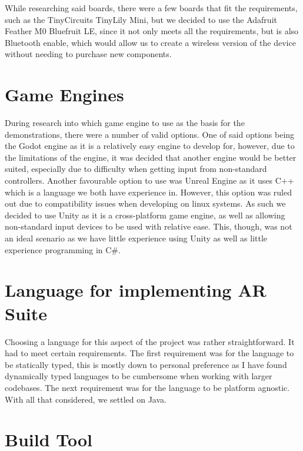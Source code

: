 \documentclass[12pt,a4paper,oneside]{book}
\theoremstyle{plain}
\numberwithin{equation}{chapter}
\newcounter{Secnum}
\begin{document}
\noindent While researching said boards, there were a few boards that fit the requirements, such as the TinyCircuits TinyLily Mini, but we decided to use the Adafruit Feather M0 Bluefruit LE, since it not only meets all the requirements, but is also Bluetooth enable, which would allow us to create a wireless version of the device without needing to purchase new components.

\section{\textbf{Game Engines}}

\noindent During research into which game engine to use as the basis for the demonstrations, there were a number of valid options. One of said options being the Godot engine as it is a relatively easy engine to develop for, however, due to the limitations of the engine, it was decided that another engine would be better suited, especially due to difficulty when getting input from non-standard controllers. Another favourable option to use was Unreal Engine as it uses C++ which is a language we both have experience in. However, this option was ruled out due to compatibility issues when developing on linux systems. As such we decided to use Unity as it is a cross-platform game engine, as well as allowing non-standard input devices to be used with relative ease. This, though, was not an ideal scenario as we have little experience using Unity as well as little experience programming in C\#.

\section{Language for implementing AR Suite}

\noindent Choosing a language for this aspect of the project was rather straightforward. It had to meet certain requirements. The first requirement was for the language to be statically typed, this is mostly down to personal preference as I have found dynamically typed languages to be cumbersome when working with larger codebases. The next requirement was for the language to be platform agnostic. With all that considered, we settled on Java.

\section{Build Tool}
\end{document}
